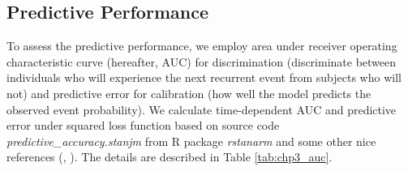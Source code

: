 \subsection{Predictive Performance}

To assess the predictive performance, we employ area under receiver operating characteristic curve (hereafter, AUC) for discrimination (discriminate between individuals who will experience the next recurrent event from subjects who will not) and predictive error for calibration (how well the model predicts the observed event probability). We calculate time-dependent AUC and predictive error under squared loss function based on source code \emph{predictive\_accuracy.stanjm} from R package \emph{rstanarm} and some other nice references (\cite{Andrinopoulou2018}, \cite{Andrinopoulou2021}). The details are described in Table \ref{tab:chp3_auc}.

